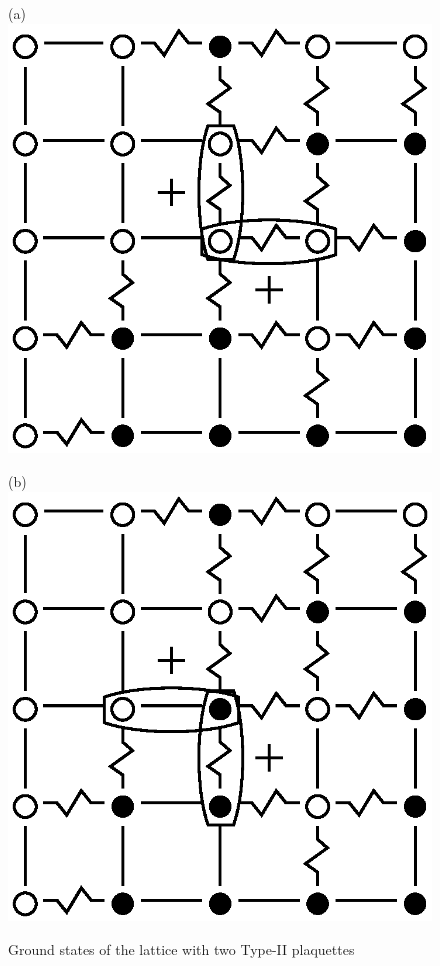 \documentclass[utf8, babel, sor, jor, amsmath, amssymb, reprint]{elsarticle} %
\begin{document}
\begin{figure}[H]
	\centering
	\begin{minipage}[h]{0.25\linewidth}
		\centering(a)
		\includegraphics[width=1\linewidth]{pictures/Cl5x5_Type2_gs1.eps}
	\end{minipage}
	\hspace{15pt}
	\begin{minipage}[h]{0.25\linewidth}
		\centering(b)
		\includegraphics[width=1\linewidth]{pictures/Cl5x5_Type2_gs2.eps}
	\end{minipage}
	\caption{Ground states of the lattice with two Type-II plaquettes}
	\label{fig:5x5.22F}
\end{figure}
\end{document}
